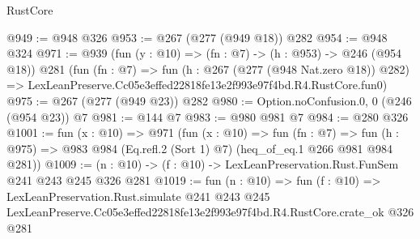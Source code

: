 \begin{lexlean}{RustCore}
\begin{coremodule}
@949 := @948 @326
@953 := @267 (@277 (@949 @18)) @282
@954 := @948 @324
@971 := @939
    (fun (y : @10) => (fn : @7) -> (h : @953) -> @246 (@954 @18))
    @281
    (fun (fn : @7) =>
    fun (h : @267 (@277 (@948 Nat.zero @18)) @282) =>
    LexLeanPreserve.Cc05e3effed22818fe13e2f993e97f4bd.R4.RustCore.fun0)
@975 := @267 (@277 (@949 @23)) @282
@980 := Option.noConfusion.{0, 0} (@246 (@954 @23)) @7
@981 := @144 @7
@983 := @980 @981 @7
@984 := @280 @326
@1001 := fun (x : @10) =>
  @971
    (fun (x : @10) =>
    fun (fn : @7) =>
    fun (h : @975) => @983 @984 (Eq.refl.{2} (Sort 1) @7) (heq_of_eq.{1} @266 @981 @984 @281))
@1009 := (n : @10) -> (f : @10) -> LexLeanPreservation.Rust.FunSem @241 @243 @245 @326 @281
@1019 := fun (n : @10) =>
  fun (f : @10) =>
  LexLeanPreservation.Rust.simulate
    @241
    @243
    @245
    LexLeanPreserve.Cc05e3effed22818fe13e2f993e97f4bd.R4.RustCore.crate_ok
    @326
    @281
\end{coremodule}
\end{lexlean}
